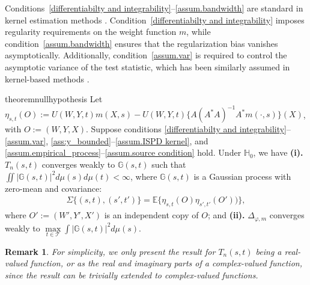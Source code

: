 \documentclass[
  12pt]{article}
\newtheorem{remark}{Remark}
\def\mG{\mathbb{G}}
\def\cT{\mathcal{T}}
\begin{document}
Conditions~\ref{differentiabilty and integrability}–\ref{assum.bandwidth} are standard in kernel estimation methods \citep{darolles2011nonparametric, babii2020unobservables, beyhum2024testing}. Condition~\ref{differentiabilty and integrability} imposes regularity requirements on the weight function $m$, while condition~\ref{assum.bandwidth} ensures that the regularization bias vanishes asymptotically. Additionally, condition~\ref{assum.var} is required to control the asymptotic variance of the test statistic, which has been similarly assumed in kernel-based methods \citep{vd1998asymptotic,li2003consistent,huang2022unified}.


\begin{restatable}{theorem}{nullhypothesis}
\label{theorem:null-hypothesis}
Let $\eta_{s,t}(O) :=U(W,Y,t)m(X,s)-U(W,Y,t) \{A(A^*A)^{-1}A^*m(\cdot,s)\}(X)$, with $O:=(W,Y,X)$. Suppose conditions \ref{differentiabilty and integrability}--\ref{assum.var}, \ref{ass:y_bounded}--\ref{assum.ISPD kernel}, and \ref{assum.empirical_process}--\ref{assum.source condition} hold. Under $\mathbb H_0$, we have \textbf{(i).} $T_n(s,t)$ converges weakly to $\mathbb{G}(s,t)$ such that $\iint |\mG(s,t)|^2 d\mu(s)d\mu(t) < \infty$, where $\mathbb{G}(s,t)$ is a Gaussian process with zero-mean and covariance:
\begin{align*}
    \Sigma\{(s,t),(s',t')\} =\mathbb{E}\{\eta_{s,t}(O)\eta_{s',t'}(O'))\},
\end{align*}
where $O':=(W',Y',X')$ is an independent copy of $O$; and \textbf{(ii).} $\Delta_{\varphi,m}$ converges weakly to $\underset{t\in \cT}{\max}\int{| \mathbb{G}(s,t)|^2d\mu(s)}$.
\end{restatable}
\begin{remark}
For simplicity, we only present the result for $T_n(s,t)$ being a real-valued function, or as the real and imaginary parts of a complex-valued function, since the result can be trivially extended to complex-valued functions.
\end{remark}
    
\end{document}
